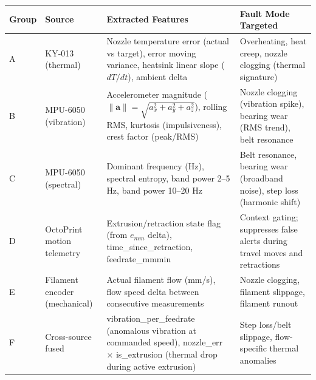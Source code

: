 {
\scriptsize
{}

\begin{tabular}{|L{2.5cm}|L{3.5cm}|L{5.0cm}|L{4.5cm}|}
	\hline
	\textbf{\color{white}Group} &
	\textbf{\color{white}Source} &
	\textbf{\color{white}Extracted Features} &
	\textbf{\color{white}Fault Mode Targeted} \\
	\hline

	A &
	KY-013 (thermal) &
	Nozzle temperature error (actual vs target), error moving variance, heatsink linear slope ($dT/dt$), ambient delta &
	Overheating, heat creep, nozzle clogging (thermal signature) \\
	\hline

	B &
	MPU-6050 (vibration) &
	Accelerometer magnitude ($\|\mathbf{a}\|=\sqrt{a_x^2+a_y^2+a_z^2}$), rolling RMS, kurtosis (impulsiveness), crest factor (peak/RMS) &
	Nozzle clogging (vibration spike), bearing wear (RMS trend), belt resonance \\
	\hline

	C &
	MPU-6050 (spectral) &
	Dominant frequency (Hz), spectral entropy, band power 2--5 Hz, band power 10--20 Hz &
	Belt resonance, bearing wear (broadband noise), step loss (harmonic shift) \\
	\hline

	D &
	OctoPrint motion telemetry &
	Extrusion/retraction state flag (from $e_{mm}$ delta), time\_since\_retraction, feedrate\_mmmin &
	Context gating; suppresses false alerts during travel moves and retractions \\
	\hline

	E &
	Filament encoder (mechanical) &
	Actual filament flow (mm/s), flow speed delta between consecutive measurements &
	Nozzle clogging, filament slippage, filament runout \\
	\hline

	F &
	Cross-source fused &
	vibration\_per\_feedrate (anomalous vibration at commanded speed), nozzle\_err $\times$ is\_extrusion (thermal drop during active extrusion) &
	Step loss/belt slippage, flow-specific thermal anomalies \\
	\hline

\end{tabular}
}